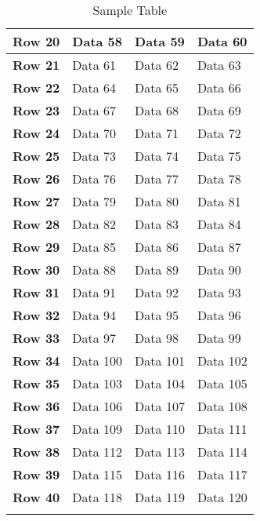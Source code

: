\begin{longtable}{|l|l|l|l|}
        \textbf{Row 20} & Data 58 & Data 59 & Data 60 \\\hline
        \textbf{Row 21} & Data 61 & Data 62 & Data 63 \\\hline
        \textbf{Row 22} & Data 64 & Data 65 & Data 66 \\\hline
        \textbf{Row 23} & Data 67 & Data 68 & Data 69 \\\hline
        \textbf{Row 24} & Data 70 & Data 71 & Data 72 \\\hline
        \textbf{Row 25} & Data 73 & Data 74 & Data 75 \\\hline
        \textbf{Row 26} & Data 76 & Data 77 & Data 78 \\\hline
        \textbf{Row 27} & Data 79 & Data 80 & Data 81 \\\hline
        \textbf{Row 28} & Data 82 & Data 83 & Data 84 \\\hline
        \textbf{Row 29} & Data 85 & Data 86 & Data 87 \\\hline
        \textbf{Row 30} & Data 88 & Data 89 & Data 90 \\\hline
        \textbf{Row 31} & Data 91 & Data 92 & Data 93 \\\hline
        \textbf{Row 32} & Data 94 & Data 95 & Data 96 \\\hline
        \textbf{Row 33} & Data 97 & Data 98 & Data 99 \\\hline
        \textbf{Row 34} & Data 100 & Data 101 & Data 102 \\\hline
        \textbf{Row 35} & Data 103 & Data 104 & Data 105 \\\hline
        \textbf{Row 36} & Data 106 & Data 107 & Data 108 \\\hline
        \textbf{Row 37} & Data 109 & Data 110 & Data 111 \\\hline
        \textbf{Row 38} & Data 112 & Data 113 & Data 114 \\\hline
        \textbf{Row 39} & Data 115 & Data 116 & Data 117 \\\hline
        \textbf{Row 40} & Data 118 & Data 119 & Data 120 \\\hline
        \caption{Sample Table}
    \end{longtable}